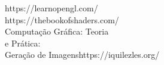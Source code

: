 \documentclass[preview]{standalone}
\begin{document}
https://learnopengl.com/\\https://thebookofshaders.com/\\Computação Gráfica: Teoria\\e Prática:\\Geração de Imagenshttps://iquilezles.org/\\
\end{document}
